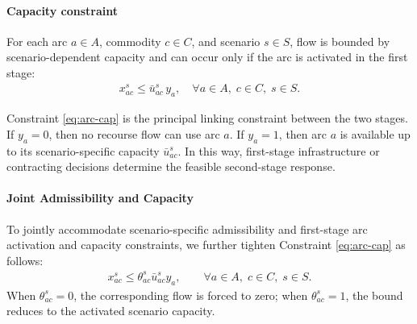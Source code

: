 \documentclass[final,3p,authoryear]{elsarticle}
\theoremstyle{definition}
\begin{document}
\paragraph{Capacity constraint}
For each arc $a \in A$, commodity $c \in C$, and scenario $s \in S$,
flow is bounded by scenario-dependent capacity and can occur only if the
arc is activated in the first stage:
\begin{align}
x_{ac}^{s}
\le
\bar u_{ac}^{s}\, y_a,
\quad \forall a \in A,\; c \in C,\; s \in S.
\label{eq:arc-cap}
\end{align}

Constraint \eqref{eq:arc-cap} is the principal linking constraint between
the two stages. If $y_a = 0$, then no recourse flow can use arc $a$.
If $y_a = 1$, then arc $a$ is available up to its scenario-specific
capacity $\bar u_{ac}^{s}$. In this way, first-stage infrastructure or
contracting decisions determine the feasible second-stage response.




\paragraph{Joint Admissibility and Capacity}
To jointly accommodate scenario-specific admissibility and
first-stage arc activation and capacity constraints, we further tighten Constraint \eqref{eq:arc-cap} as follows: 
\begin{align}
x_{ac}^s \le \theta_{ac}^s \bar u_{ac}^s y_a,
\qquad \forall a \in A,\; c \in C,\; s \in S.
\label{eq:admiss-tight}
\end{align}
When $\theta_{ac}^s = 0$, the corresponding flow is forced to zero; when
$\theta_{ac}^s = 1$, the bound reduces to the activated scenario capacity.
\end{document}
